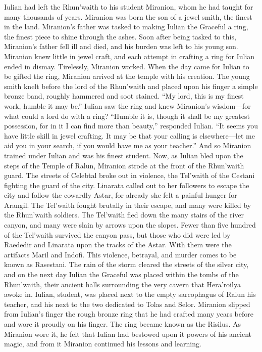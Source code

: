\documentclass[smalldemyvopaper,11pt,twoside,onecolumn,openright,extrafontsizes]{memoir}
\begin{document}
{{Iulian had left the Rhun’waith to his student Miranion, whom he had taught for many thousands of years. Miranion was born the son of a jewel smith, the finest in the land. Miranion’s father was tasked to making Iulian the Graceful a ring, the finest piece to shine through the ashes. Soon after being tasked to this, Miranion’s father fell ill and died, and his burden was left to his young son. Miranion knew little in jewel craft, and each attempt in crafting a ring for Iulian ended in dismay. Tirelessly, Miranion worked. When the day came for Iulian to be gifted the ring, Miranion arrived at the temple with his creation. The young smith knelt before the lord of the Rhun’waith and placed upon his finger a simple bronze band, roughly hammered and soot stained. “My lord, this is my finest work, humble it may be.” Iulian saw the ring and knew Miranion’s wisdom—for what could a lord do with a ring?
“Humble it is, though it shall be my greatest possession, for in it I can find more than beauty,” responded Iulian. “It seems you have little skill in jewel crafting. It may be that your calling is elsewhere—let me aid you in your search, if you would have me as your teacher.” And so Miranion trained under Iulian and was his finest student. Now, as Iulian bled upon the steps of the Temple of Ralun, Miranion strode at the front of the Rhun’waith guard. The streets of Celebtal broke out in violence, the Tel’waith of the Cestani fighting the guard of the city. Linarata called out to her followers to escape the city and follow the cowardly Astar, for already she felt a painful hunger for Arangil. The Tel’waith fought brutally in their escape, and many were killed by the Rhun’waith soldiers. The Tel’waith fled down the many stairs of the river canyon, and many were slain by arrows upon the slopes. Fewer than five hundred of the Tel’waith survived the canyon pass, but those who did were led by Raededir and Linarata upon the tracks of the Astar. With them were the artifacts Maril and Indofi. This violence, betrayal, and murder comes to be known as Rasestani.
The rain of the storm cleared the streets of the silver city, and on the next day Iulian the Graceful was placed within the tombs of the Rhun’waith, their ancient halls surrounding the very cavern that Hera’roilya awoke in. Iulian, student, was placed next to the empty sarcophagus of Ralun his teacher, and his next to the two dedicated to Tolas and Selor. Miranion slipped from Iulian’s finger the rough bronze ring that he had crafted many years before and wore it proudly on his finger. The ring became known as the Risilus. As Miranion wore it, he felt that Iulian had bestowed upon it powers of his ancient magic, and from it Miranion continued his lessons and learning.

}}
\end{document}
